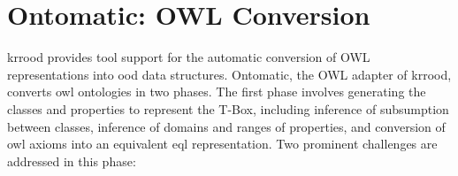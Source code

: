 \documentclass{article}
\newcommand{\todo}[1]{\textcolor{red}{\textbf{TODO: #1}}}
\begin{document}






\section{Ontomatic: OWL Conversion}
\label{sec:ontomatic}

\ac{krrood} provides tool support for the automatic conversion of OWL representations into \ac{ood} data structures. Ontomatic, the OWL adapter of \ac{krrood}, converts \ac{owl} ontologies in two phases. The first phase involves generating the classes and properties to represent the T-Box, including inference of subsumption between classes, inference of domains and ranges of properties, and conversion of \ac{owl} axioms into an equivalent \ac{eql} representation. Two prominent challenges are addressed in this phase:
\end{document}
